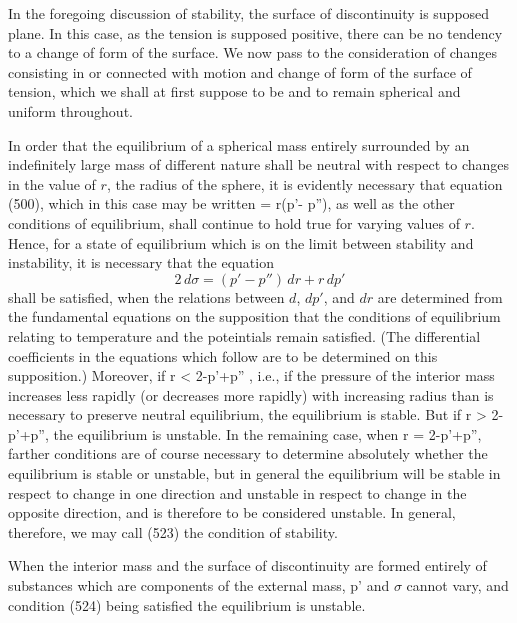 \documentclass[12pt]{article}
\begin{document}
{%

In the foregoing discussion of stability, the surface of discontinuity is supposed plane. In this case, as the tension is supposed positive, there can be no tendency to a change of form of the surface. We now pass to the consideration of changes consisting in or connected with motion and change of form of the surface of tension, which we shall at first suppose to be and to remain spherical and uniform throughout.

In order that the equilibrium of a spherical mass entirely surrounded by an indefinitely large mass of different nature shall be neutral with respect to changes in the value of $r$, the radius of the sphere, it is evidently necessary that equation (500), which in this case may be written
\sigma= r(p'- p''), \label{522} \eqe
as well as the other conditions of equilibrium, shall continue to hold true for varying values of $r$. Hence, for a state of equilibrium which is on the limit between stability and instability, it is necessary that the equation
$$ 2 \, d\sigma = (p' -p'') \, dr + r \, dp' $$
shall be satisfied, when the relations between $d$, $dp'$, and $dr$ are determined from the fundamental equations on the supposition that the conditions of equilibrium relating to temperature and the poteintials remain satisfied. (The differential coefficients in the equations which follow are to be determined on this supposition.) Moreover, if
\eqs r   < 2-p'+p'' , \label{523} \eqe
i.e., if the pressure of the interior mass increases less rapidly (or decreases more rapidly) with increasing radius than is necessary to preserve neutral equilibrium, the equilibrium is stable. But if
\eqs r   > 2-p'+p'',  \label{524} \eqe
the equilibrium is unstable. In the remaining case, when
\eqs r   = 2-p'+p'', \label{525} \eqe
farther conditions are of course necessary to determine absolutely whether the equilibrium is stable or unstable, but in general the equilibrium will be stable in respect to change in one direction and unstable in respect to change in the opposite direction, and is therefore to be considered unstable. In general, therefore, we may call (523) the condition of stability.

When the interior mass and the surface of discontinuity are formed entirely of substances which are components of the external mass, p' and $\sigma$ cannot vary, and condition (524) being satisfied the equilibrium is unstable.

}
\end{document}

